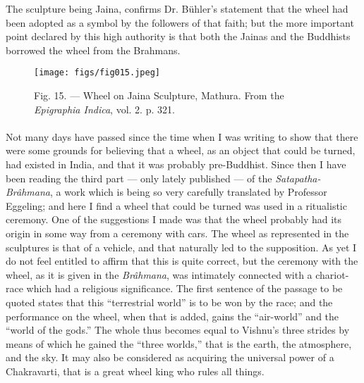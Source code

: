 \documentclass[a4paper, 11pt, oneside, polutonikogreek, english]{article}
\begin{document}
The sculpture being Jaina, confirms Dr. Bühler's statement that the wheel had been adopted as a symbol by the followers of that faith; but the more important point declared by this high authority is that both the Jainas and the Buddhists borrowed the wheel from the Brahmans.

\begin{figure}[H]
\centering
\texttt{[image: figs/fig015.jpeg]}
\caption{Fig. 15. --- Wheel on Jaina Sculpture, Mathura. From the \emph{Epigraphia Indica}, vol. 2. p. 321.}
\end{figure}
\paragraph{}
Not many days have passed since the time when I was writing to show that there were some grounds for believing that a wheel, as an object that could be turned, had existed in India, and that it was probably pre-Buddhist. Since then I have been reading the third part --- only lately published --- of the \emph{Satapatha-Brâhmana}, a work which is being so very carefully translated by Professor Eggeling; and here I find a wheel that could be turned was used in a ritualistic ceremony. One of the suggestions I made was that the wheel probably had its origin in some way from a ceremony with cars. The wheel as represented in the sculptures is that of a vehicle, and that naturally led to the supposition. As yet I do not feel entitled to affirm that this is quite correct, but the ceremony with the wheel, as it is given in the \emph{Brâhmana}, was intimately connected with a chariot-race which had a religious significance. The first sentence of the passage to be quoted states that this ``terrestrial world'' is to be won by the race; and the performance on the wheel, when that is added, gains the ``air-world'' and the ``world of the gods.'' The whole thus becomes equal to Vishnu's three strides by means of which he gained the ``three worlds,'' that is the earth, the atmosphere, and the sky. It may also be considered as acquiring the universal power of a Chakravarti, that is a great wheel king who rules all things.
\end{document}
